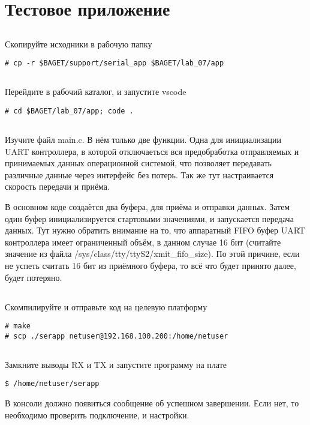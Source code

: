 \section{Тестовое приложение}

\subsection{}Скопируйте исходники в рабочую папку
\begin{lstlisting}[style=bash]
# cp -r $BAGET/support/serial_app $BAGET/lab_07/app
\end{lstlisting}

\subsection{}Перейдите в рабочий каталог, и запустите vscode
\begin{lstlisting}[style=bash]
# cd $BAGET/lab_07/app; code .
\end{lstlisting}

\subsection{}Изучите файл main.c. В нём только две функции. Одна для инициализации UART контроллера, в которой отключаеться вся предобработка отправляемых и принимаемых данных операционной системой, что позволяет передавать различные данные через интерфейс без потерь. Так же тут настраивается скорость передачи и приёма. 

В основном коде создаётся два буфера, для приёма и отправки данных. Затем один буфер инициализируется стартовыми значениями, и запускается передача данных. Тут нужно обратить внимание на то, что аппаратный FIFO буфер UART контроллера имеет ограниченный объём, в данном случае 16 бит (считайте значение из файла /sys/class/tty/ttyS2/xmit\_fifo\_size). По этой причине, если не успеть считать 16 бит из приёмного буфера, то всё что будет принято далее, будет потеряно.

\subsection{}Скомпилируйте и отправьте код на целевую платформу
\begin{lstlisting}[style=bash]
# make
# scp ./serapp netuser@192.168.100.200:/home/netuser
\end{lstlisting}

\subsection{}Замкните выводы RX и TX и запустите программу на плате
\begin{lstlisting}[style=bash]
$ /home/netuser/serapp
\end{lstlisting}
В консоли должно появиться сообщение об успешном завершении. Если нет, то необходимо проверить подключение, и настройки.

